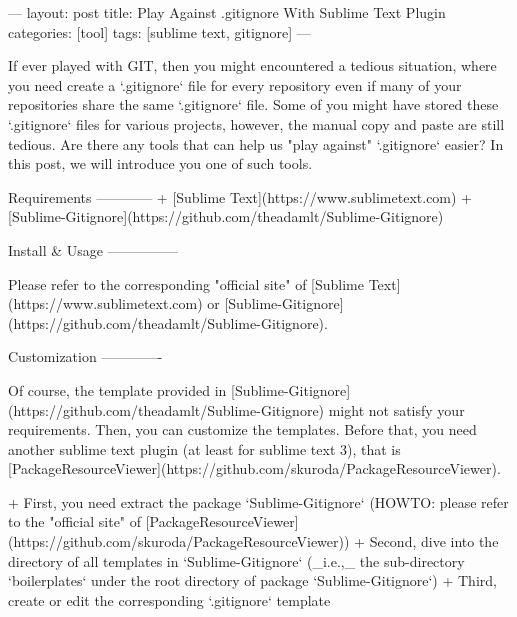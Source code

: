 ---
layout: post
title: Play Against .gitignore With Sublime Text Plugin
categories: [tool]
tags: [sublime text, gitignore]
---

If ever played with GIT, then you might encountered a tedious situation, where you need create a `.gitignore` file for every repository even if many of your repositories share the same `.gitignore` file. Some of you might have stored these `.gitignore` files for various projects, however, the manual copy and paste are still tedious. Are there any tools that can help us "play against" `.gitignore` easier? In this post, we will introduce you one of such tools.

Requirements
------------
+ [Sublime Text](https://www.sublimetext.com)
+ [Sublime-Gitignore](https://github.com/theadamlt/Sublime-Gitignore)

Install & Usage
---------------

Please refer to the corresponding "official site" of [Sublime Text](https://www.sublimetext.com) or [Sublime-Gitignore](https://github.com/theadamlt/Sublime-Gitignore).


Customization
-------------

Of course, the template provided in [Sublime-Gitignore](https://github.com/theadamlt/Sublime-Gitignore) might not satisfy your requirements. Then, you can customize the templates. Before that, you need another sublime text plugin (at least for sublime text 3), that is [PackageResourceViewer](https://github.com/skuroda/PackageResourceViewer). 

+ First, you need extract the package `Sublime-Gitignore` (HOWTO: please refer to the "official site" of [PackageResourceViewer](https://github.com/skuroda/PackageResourceViewer))
+ Second, dive into the directory of all templates in `Sublime-Gitignore` (_i.e.,_ the sub-directory `boilerplates` under the root directory of package `Sublime-Gitignore`)
+ Third, create or edit the corresponding `.gitignore` template


